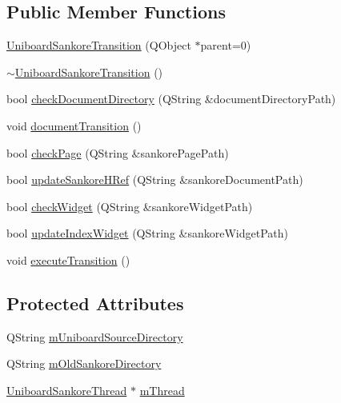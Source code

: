 \subsection*{Public Member Functions}
\begin{DoxyCompactItemize}
\item 
\hyperlink{class_uniboard_sankore_transition_a85b9cb75da28502ddd305736f8aaeadf}{Uniboard\-Sankore\-Transition} (Q\-Object $\ast$parent=0)
\item 
\hyperlink{class_uniboard_sankore_transition_a4b4662dc50a912b252e5f4de7406f8e8}{$\sim$\-Uniboard\-Sankore\-Transition} ()
\item 
bool \hyperlink{class_uniboard_sankore_transition_ac4667b0b3762eb566f2d6086e226c14e}{check\-Document\-Directory} (Q\-String \&document\-Directory\-Path)
\item 
void \hyperlink{class_uniboard_sankore_transition_ac6bb9a331392857b112ddcfb867d99cc}{document\-Transition} ()
\item 
bool \hyperlink{class_uniboard_sankore_transition_afb9af185fb60df8b2faeec763ee7e737}{check\-Page} (Q\-String \&sankore\-Page\-Path)
\item 
bool \hyperlink{class_uniboard_sankore_transition_a79c2c28aa287e2b3cd8832ac5bee8283}{update\-Sankore\-H\-Ref} (Q\-String \&sankore\-Document\-Path)
\item 
bool \hyperlink{class_uniboard_sankore_transition_a283e94bc3dd8e9ac582794e3870def74}{check\-Widget} (Q\-String \&sankore\-Widget\-Path)
\item 
bool \hyperlink{class_uniboard_sankore_transition_aa510a01b6c46a4c13af58ee8a4f06e06}{update\-Index\-Widget} (Q\-String \&sankore\-Widget\-Path)
\item 
void \hyperlink{class_uniboard_sankore_transition_a9b27fb4acafb20d28b9423bd724cc279}{execute\-Transition} ()
\end{DoxyCompactItemize}
\subsection*{Protected Attributes}
\begin{DoxyCompactItemize}
\item 
Q\-String \hyperlink{class_uniboard_sankore_transition_a1d345315b23aecd23f91196c14071457}{m\-Uniboard\-Source\-Directory}
\item 
Q\-String \hyperlink{class_uniboard_sankore_transition_a996150102eb052a27b3b317c8e4813d8}{m\-Old\-Sankore\-Directory}
\item 
\hyperlink{class_uniboard_sankore_thread}{Uniboard\-Sankore\-Thread} $\ast$ \hyperlink{class_uniboard_sankore_transition_ae14a529d4d0ed7a98ef1d3f442b37d18}{m\-Thread}
\end{DoxyCompactItemize}


